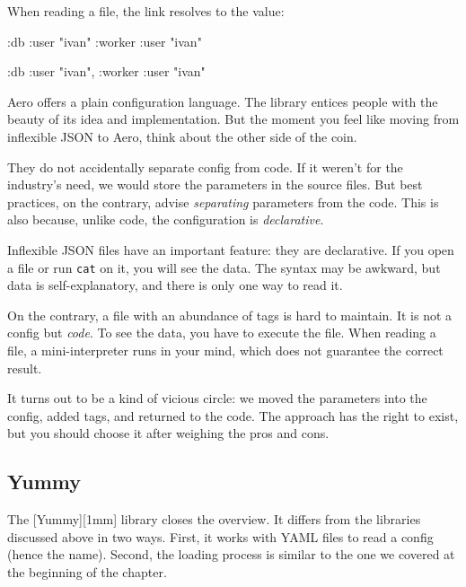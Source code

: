 \noindent
When reading a file, the link resolves to the value:

\ifx\DEVICETYPE\MOBILE

\begin{clojure}
{:db {:user "ivan"}
 :worker {:user "ivan"}}
\end{clojure}

\else

\begin{clojure}
{:db {:user "ivan"}, :worker {:user "ivan"}}
\end{clojure}

\fi

Aero offers a plain configuration language. The library entices people with the beauty of its idea and implementation. But the moment you feel like moving from inflexible JSON to Aero, think about the other side of the coin.


They do not accidentally separate config from code. If it weren't for the industry's need, we would store the parameters in the source files. But best practices, on the contrary, advise \emph{separating} parameters from the code. This is also because, unlike code, the configuration is \emph{declarative}.

Inflexible JSON files have an important feature: they are declarative. If you open a file or run \verb|cat| on it, you will see the data. The syntax may be awkward, but data is self-explanatory, and there is only one way to read it.

On the contrary, a file with an abundance of tags is hard to maintain. It is not a config but \emph{code}. To see the data, you have to execute the file. When reading a file, a mini-interpreter runs in your mind, which does not guarantee the correct result.

It turns out to be a kind of vicious circle: we moved the parameters into the config, added tags, and returned to the code. The approach has the right to exist, but you should choose it after weighing the pros and cons.

\subsection{Yummy}


The [Yummy][1mm] library closes the overview. It differs from the libraries discussed above in two ways. First, it works with YAML files to read a config (hence the name). Second, the loading process is similar to the one we covered at the beginning of the chapter.

